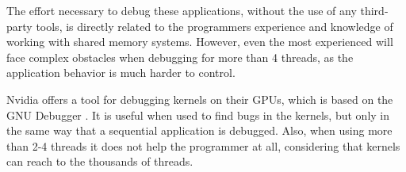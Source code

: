 The effort necessary to debug these applications, without the use of any third-party tools, is directly related to the programmers experience and knowledge of working with shared memory systems. However, even the most experienced will face complex obstacles when debugging for more than 4 threads, as the application behavior is much harder to control.

Nvidia offers a tool for debugging \cuda kernels on their GPUs, which is based on the GNU Debugger \cite{NVIDIA:gdb}. It is useful when used to find bugs in the kernels, but only in the same way that a sequential application is debugged. Also, when using more than 2-4 \cuda threads it does not help the programmer at all, considering that \cuda kernels can reach to the thousands of threads.

\newpage
